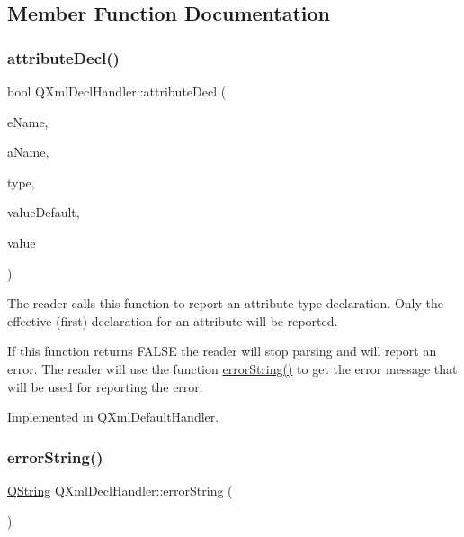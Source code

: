 \subsection{Member Function Documentation}
\mbox{\label{class_q_xml_decl_handler_a199291017634d148a72812cb40de2043}} 
\subsubsection{\texorpdfstring{attributeDecl()}{attributeDecl()}}
{\footnotesize\ttfamily bool Q\+Xml\+Decl\+Handler\+::attribute\+Decl (\begin{DoxyParamCaption}\item[{const \mbox{\hyperlink{class_q_string}{Q\+String}} \&}]{e\+Name,  }\item[{const \mbox{\hyperlink{class_q_string}{Q\+String}} \&}]{a\+Name,  }\item[{const \mbox{\hyperlink{class_q_string}{Q\+String}} \&}]{type,  }\item[{const \mbox{\hyperlink{class_q_string}{Q\+String}} \&}]{value\+Default,  }\item[{const \mbox{\hyperlink{class_q_string}{Q\+String}} \&}]{value }\end{DoxyParamCaption})\hspace{0.3cm}{\ttfamily [pure virtual]}}

The reader calls this function to report an attribute type declaration. Only the effective (first) declaration for an attribute will be reported.

If this function returns F\+A\+L\+SE the reader will stop parsing and will report an error. The reader will use the function \mbox{\hyperlink{class_q_xml_decl_handler_a92d52f5e57b8041a956c30b92dd28161}{error\+String()}} to get the error message that will be used for reporting the error. 

Implemented in \mbox{\hyperlink{class_q_xml_default_handler_a59b03fd7d0242d1172a4e5d8cc8154db}{Q\+Xml\+Default\+Handler}}.

\mbox{\label{class_q_xml_decl_handler_a92d52f5e57b8041a956c30b92dd28161}} 
\subsubsection{\texorpdfstring{errorString()}{errorString()}}
{\footnotesize\ttfamily \mbox{\hyperlink{class_q_string}{Q\+String}} Q\+Xml\+Decl\+Handler\+::error\+String (\begin{DoxyParamCaption}{ }\end{DoxyParamCaption})\hspace{0.3cm}{\ttfamily [pure virtual]}}

